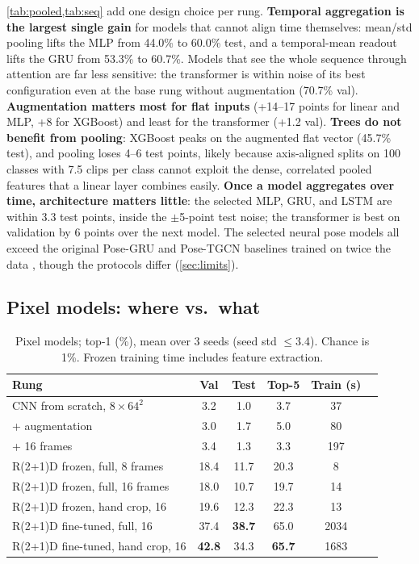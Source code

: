\documentclass{article}
\begin{document}
\cref{tab:pooled,tab:seq} add one design choice per rung.
\textbf{Temporal aggregation is the largest single gain} for models that cannot align time themselves:
mean/std pooling lifts the MLP from 44.0\% to 60.0\% test, and a temporal-mean readout lifts the GRU from
53.3\% to 60.7\%. Models that see the whole sequence through attention are far less sensitive: the
transformer is within noise of its best configuration even at the base rung without augmentation
(70.7\% val).
\textbf{Augmentation matters most for flat inputs} (+14--17 points for linear and MLP, +8 for XGBoost) and
least for the transformer (+1.2 val).
\textbf{Trees do not benefit from pooling}: XGBoost peaks on the augmented flat vector (45.7\% test),
and pooling loses 4--6 test points, likely because axis-aligned splits on 100 classes with 7.5 clips per
class cannot exploit the dense, correlated pooled features that a linear layer combines easily.
\textbf{Once a model aggregates over time, architecture matters little}: the selected MLP, GRU, and LSTM
are within 3.3 test points, inside the $\pm$5-point test noise; the transformer is best on validation by
6 points over the next model.
The selected neural pose models all exceed the original Pose-GRU and Pose-TGCN baselines trained on
twice the data \citep{li2020wlasl}, though the protocols differ (\cref{sec:limits}).

\subsection{Pixel models: where vs.\ what}\label{sec:pixels}
\begin{table}[t]
\centering\footnotesize\setlength{\tabcolsep}{3pt}
\begin{tabular}{lccccr}
\toprule
Rung & Val & Test & Top-5 & Train (s) \\
\midrule
CNN from scratch, $8\times64^2$       & 3.2 & 1.0 & 3.7 & 37 \\
\quad + augmentation                  & 3.0 & 1.7 & 5.0 & 80 \\
\quad + 16 frames                     & 3.4 & 1.3 & 3.3 & 197 \\
\midrule
R(2+1)D frozen, full, 8 frames        & 18.4 & 11.7 & 20.3 & 8 \\
R(2+1)D frozen, full, 16 frames       & 18.0 & 10.7 & 19.7 & 14 \\
R(2+1)D frozen, hand crop, 16         & 19.6 & 12.3 & 22.3 & 13 \\
R(2+1)D fine-tuned, full, 16          & 37.4 & \textbf{38.7} & 65.0 & 2034 \\
R(2+1)D fine-tuned, hand crop, 16     & \textbf{42.8} & 34.3 & \textbf{65.7} & 1683 \\
\bottomrule
\end{tabular}
\caption{Pixel models; top-1 (\%), mean over 3 seeds (seed std $\le$3.4). Chance is 1\%. Frozen
training time includes feature extraction.}
\label{tab:pixels}
\end{table}
\end{document}
